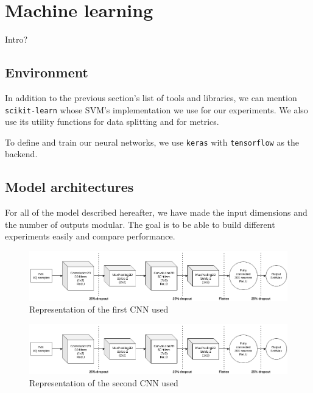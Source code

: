 \section{Machine learning}

Intro?

\subsection{Environment}

In addition to the previous section's list of tools and libraries, we can mention \texttt{scikit-learn} whose SVM's implementation we use for our experiments. We also use its utility functions for data splitting and for metrics.

To define and train our neural networks, we use \texttt{keras} with \texttt{tensorflow} as the backend.

\subsection{Model architectures}

For all of the model described hereafter, we have made the input dimensions and the number of outputs modular. The goal is to be able to build different experiments easily and compare performance.

\textcite{riyaz_deep_2018}

\begin{figure}[htbp!]
  \centering
  \includegraphics[scale=0.6]{figures/ml_riyaz.png}
  \caption{Representation of the first CNN used}
  \label{fig:cnn-riyaz}
\end{figure}

\textcite{youssef_machine_2017}

\begin{figure}[htbp!]
  \centering
  \includegraphics[scale=0.6]{figures/ml_riyaz.png}
  \caption{Representation of the second CNN used}
  \label{fig:cnn-youssef}
\end{figure}

